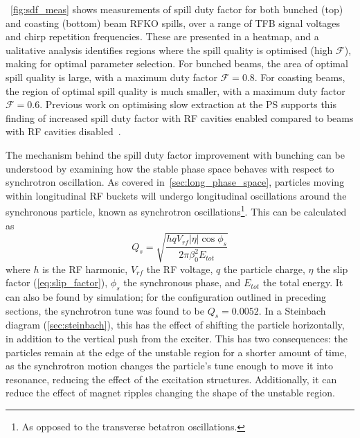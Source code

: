 \documentclass[11pt]{report}
\begin{document}
~\autoref{fig:sdf_meas} shows measurements of spill duty factor for both bunched (top) and coasting (bottom) beam RFKO spills, over a range of TFB signal voltages and chirp repetition frequencies. These are presented in a heatmap, and a ualitative analysis identifies regions where the spill quality is optimised (high $\mathcal{F}$), making for optimal parameter selection. For bunched beams, the area of optimal spill quality is large, with a maximum duty factor $\mathcal{F} = 0.8$. For coasting beams, the region of optimal spill quality is much smaller, with a maximum duty factor $\mathcal{F} = 0.6$. Previous work on optimising slow extraction at the PS supports this finding of increased spill duty factor with RF cavities enabled compared to beams with RF cavities disabled~\cite{Cappi:134321}.

The mechanism behind the spill duty factor improvement with bunching can be understood by examining how the stable phase space behaves with respect to synchrotron oscillation. As covered in~\autoref{sec:long_phase_space}, particles moving within longitudinal RF buckets will undergo longitudinal oscillations around the synchronous particle, known as synchrotron oscillations\footnote{As opposed to the transverse betatron oscillations.}. This can be calculated as
\begin{equation}
  Q_s = \sqrt{\frac{hqV_{rf}|\eta|\cos\phi_s}{2\pi\beta_0^2E_{tot}}}
\end{equation} where $h$ is the RF harmonic, $V_{rf}$ the RF voltage, $q$ the particle charge, $\eta$ the slip factor (\autoref{eq:slip_factor}), $\phi_s$ the synchronous phase, and $E_{tot}$ the total energy. It can also be found by simulation; for the configuration outlined in preceding sections, the synchrotron tune was found to be $Q_s = 0.0052$. 
In a Steinbach diagram (\autoref{sec:steinbach}), this has the effect of shifting the particle horizontally, in addition to the vertical push from the exciter. This has two consequences: the particles remain at the edge of the unstable region for a shorter amount of time, as the synchrotron motion changes the particle's tune enough to move it into resonance, reducing the effect of the excitation structures. Additionally, it can reduce the effect of magnet ripples changing the shape of the unstable region.
\end{document}

